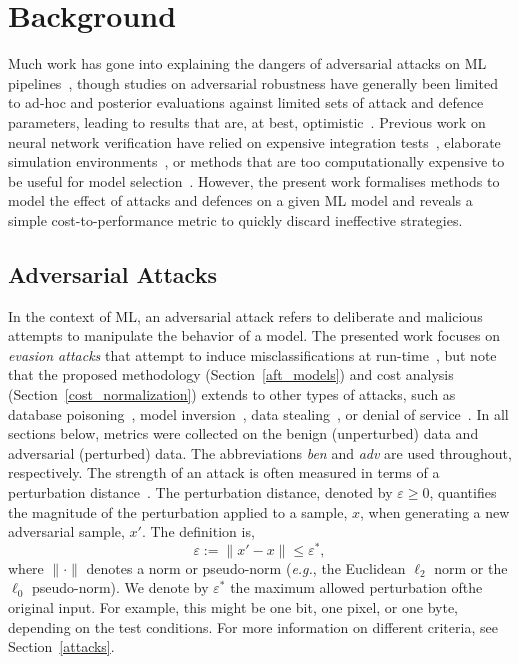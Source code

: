 \section{Background}

Much work has gone into explaining the dangers of adversarial attacks on ML pipelines~\cite{carlini_towards_2017,croce_reliable_2020,pixelattack,fgm,biggio_evasion_2013}, though studies on adversarial robustness have generally been limited to ad-hoc and posterior evaluations against limited sets of attack and defence parameters, leading to results that are, at best, optimistic~\cite{meyers,ma2020imbalanced}. Previous work on neural network verification have relied on expensive integration tests~\cite{vehicle_testing_review}, elaborate simulation environments~\cite{vehicle_formal}, or methods that are too computationally expensive to be useful for model selection~\cite{formal_adversarial}.
However, the present work formalises methods to model the effect of attacks and defences on a given ML model and reveals a simple cost-to-performance metric to quickly discard ineffective strategies.


\subsection{Adversarial Attacks}

In the context of ML, an adversarial attack refers to deliberate and malicious attempts to manipulate the behavior of a model. The presented work focuses on \textit{evasion attacks} that attempt to induce misclassifications at run-time~\cite{carlini_towards_2017,biggio_evasion_2013}, but note that the proposed methodology (Section~\ref{aft_models}) and cost analysis (Section~\ref{cost_normalization}) extends to other types of attacks, such as database poisoning~\cite{biggio_poisoning_2013,saha2020hidden}, model inversion~\cite{choquette2021label,li2021membership}, data stealing~\cite{orekondy2019knockoff}, or denial of service~\cite{santos2021universal}. In all sections below, metrics were collected on the benign (unperturbed) data and adversarial (perturbed) data. The abbreviations \textit{ben} and \textit{adv} are used throughout, respectively.
The strength of an attack is often measured in terms of a perturbation distance~\cite{croce_reliable_2020,chakraborty_adversarial_2018,pixelattack}. The perturbation distance, denoted by $\varepsilon\geq0$, quantifies the magnitude of the perturbation applied to a sample, $x$, when generating a new adversarial sample, $x'$. The definition is,
\begin{equation}
    \varepsilon := \| x' - x \| \leq \varepsilon^*,
    \label{eq:perturbation_distance}
\end{equation}
where $\| \cdot \|$ denotes a norm or pseudo-norm (\textit{e.g.}, the Euclidean $\ell_2$ norm or the $\ell_0$ pseudo-norm). We denote by $\varepsilon^*$ the maximum allowed perturbation ofthe original input. For example, this might be one bit, one pixel, or one byte, depending on the test conditions. For more information on different criteria, see Section~\ref{attacks}.


